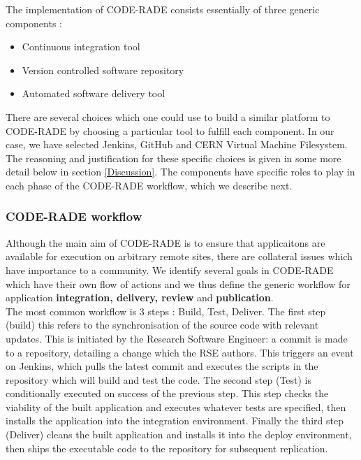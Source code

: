 \documentclass[a4paper]{jpconf}
\begin{document}
	The implementation of CODE-RADE consists essentially of three generic components :

	\begin{itemize}
		\item Continuous integration tool
		\item Version controlled software repository
		\item Automated software delivery tool
	\end{itemize}

    There are several choices  which one could use to build a similar platform to CODE-RADE by
    choosing a particular tool to fulfill each component. In our case, we have selected
    Jenkins\cite{Jenkins}, GitHub\cite{Github} and CERN Virtual Machine Filesystem\cite{CVMFS}. The
    reasoning and justification for these specific choices is given in some more detail below in
    section \ref{Discussion}. The components have specific roles to play in each phase of the
    CODE-RADE workflow, which we describe next.

	\subsubsection{CODE-RADE workflow}

    Although the main aim of CODE-RADE is to ensure that applicaitons are available for execution on
    arbitrary remote sites, there are collateral issues which have importance to a community. We
    identify several goals in CODE-RADE which have their own flow of actions and we thus define the
    generic workflow for application {\bf integration, delivery, review} and {\bf publication}.\\

	The most common workflow is 3 steps : Build, Test, Deliver.  
    The first step (build) this refers to the synchronisation of the source code with relevant
    updates. This is initiated by the Research Software Engineer: a commit is made to a repository,
    detailing a change which the RSE authors. This triggers an event on Jenkins, which pulls the
    latest commit and executes the scripts in the repository which will build and test the code. The
    second step (Test) is conditionally executed on success of the previous step. This step checks
    the viability of the built application and executes whatever tests are specified, then installs
    the application into the integration environment. Finally the third step (Deliver) cleans the
    built application and installs it into the deploy environment, then ships the executable code to
    the repository for subsequent replication.
\end{document}
